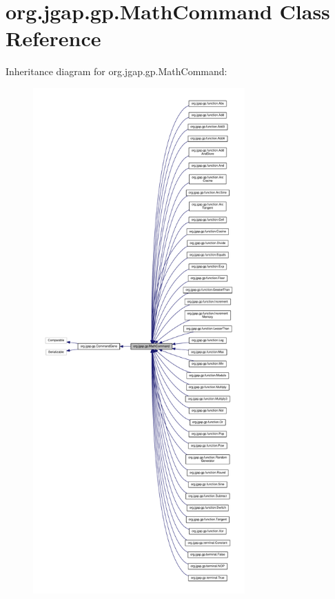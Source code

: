 \hypertarget{classorg_1_1jgap_1_1gp_1_1_math_command}{\section{org.\-jgap.\-gp.\-Math\-Command Class Reference}
\label{classorg_1_1jgap_1_1gp_1_1_math_command}
}


Inheritance diagram for org.\-jgap.\-gp.\-Math\-Command\-:
\nopagebreak
\begin{figure}[H]
\begin{center}
\leavevmode
\includegraphics[height=550pt]{classorg_1_1jgap_1_1gp_1_1_math_command__inherit__graph}
\end{center}
\end{figure}


